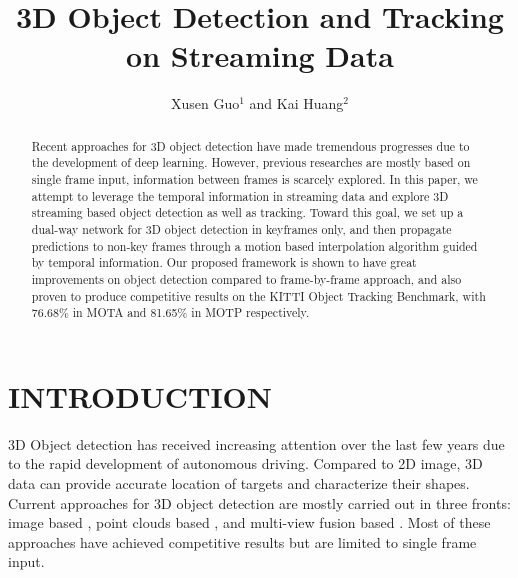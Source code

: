 \documentclass[a4paper, 10pt, conference]{ieeeconf}      %
\title{\LARGE \bf
3D Object Detection and Tracking on Streaming Data
}
\author{Xusen Guo$^{1}$ and Kai Huang$^{2}$%
}
\begin{document}
\maketitle
\thispagestyle{empty}
\pagestyle{empty}


\begin{abstract}

Recent approaches for 3D object detection have made tremendous progresses due to the development of deep learning. However, previous researches are mostly based on single frame input, information between frames is scarcely explored. In this paper, we attempt to leverage the temporal information in streaming data and explore 3D streaming based object detection as well as tracking. Toward this goal, we set up a dual-way network for 3D object detection in keyframes only, and then propagate predictions to non-key frames through a motion based interpolation algorithm guided by temporal information. Our proposed framework is shown to have great improvements on object detection compared to frame-by-frame approach, and also proven to produce competitive results on the KITTI Object Tracking Benchmark, with 76.68\% in MOTA and 81.65\% in MOTP respectively.


\end{abstract}

\section{INTRODUCTION}

3D Object detection has received increasing attention over the last few years due to the rapid development of autonomous driving. Compared to 2D image, 3D data can provide accurate location of targets and characterize their shapes. Current approaches for 3D object detection are mostly carried out in three fronts: image based \cite{7780605, chen20183d}, point clouds based \cite{zhou2018voxelnet,yang2018pixor,simon2018complex}, and multi-view fusion based \cite{chen2017multi,ku2018joint}. Most of these approaches have achieved competitive results but are limited to single frame input.
\end{document}
